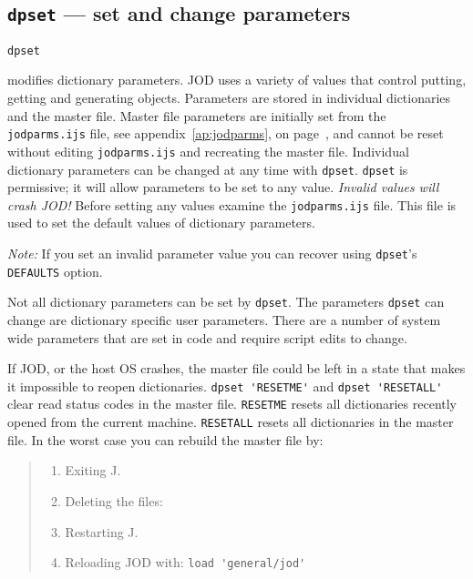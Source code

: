 \subsection{\texttt{dpset} --- set and change parameters}\label{ss:dpset}

\hypertarget{il:dpset}{\texttt{dpset}} modifies dictionary parameters. JOD uses a 
variety of values that control putting, getting and generating objects. 
Parameters are stored in individual dictionaries and 
the master file. Master file parameters are initially 
set from the \verb|jodparms.ijs| file, see appendix~\ref{ap:jodparms}, on
page~\pageref{ap:jodparms}, and cannot be reset without 
editing \verb|jodparms.ijs| and recreating the master file. Individual 
dictionary parameters can be changed at any time with \texttt{dpset}. \texttt{dpset} is permissive; 
it will allow parameters to be set to any value. \emph{Invalid values will 
crash JOD!} Before setting any values examine the \verb|jodparms.ijs| file. 
This file is used to set the default values of dictionary parameters. 

\emph{Note:} If you set an invalid parameter
 value you can recover using \texttt{dpset}'s \texttt{DEFAULTS} option. 

Not all dictionary parameters can be set by \texttt{dpset}. 
The parameters \texttt{dpset} can change are dictionary specific 
user parameters. There are a number of system wide parameters 
that are set in code and require script edits to change. 

If JOD, or the host OS crashes, the master file could be
 left in a state that makes it impossible to reopen dictionaries.
  \verb|dpset 'RESETME'| and \verb|dpset 'RESETALL'| clear read status codes in the master file.
   \texttt{RESETME} resets all dictionaries recently opened from the current machine. 
   \texttt{RESETALL} resets all dictionaries in the master file.  
   In the worst case you can rebuild the master file by:
\begin{quotation}
	\noindent\begin{enumerate}
	  \item Exiting J.
	  \item Deleting the files:
	  \item Restarting J.
	  \item Reloading JOD with: \verb|load 'general/jod'|
	\end{enumerate}  
\end{quotation}


